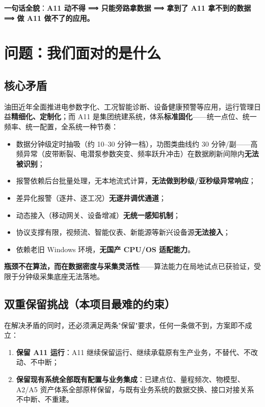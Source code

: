 \documentclass[11pt,a4paper]{ctexart}
\begin{document}
\textbf{一句话全貌}：\textbf{A11 动不得 ⟹ 只能旁路拿数据 ⟹ 拿到了 A11 拿不到的数据 ⟹ 做 A11 做不了的应用。}

\section{问题：我们面对的是什么}

\subsection{核心矛盾}

油田近年全面推进电参数字化、工况智能诊断、设备健康预警等应用，运行管理日益\textbf{精细化、定制化}；而 A11 是集团统建系统，体系\textbf{标准固化}——统一点位、统一频率、统一配置，全系统一种节奏：

\begin{itemize}[leftmargin=*]
  \item 数据分钟级定时抽吸（约 10--30 分钟一档），功图类曲线约 30 分钟/副——高频异常（皮带断裂、电潜泵参数突变、频率跃升冲击）在数据刷新间隙内\textbf{无法被识别}；
  \item 报警依赖后台批量处理，无本地流式计算，\textbf{无法做到秒级/亚秒级异常响应}；
  \item 差异化报警（逐井、逐工况）\textbf{无逐井调优通道}；
  \item 动态接入（移动网关、设备增减）\textbf{无统一感知机制}；
  \item 协议支撑有限，视频流、智能仪表、新能源等新兴设备源\textbf{无法接入}；
  \item 依赖老旧 Windows 环境，\textbf{无国产 CPU/OS 适配能力}。
\end{itemize}

\textbf{瓶颈不在算法，而在数据密度与采集灵活性}——算法能力在局地试点已获验证，受限于分钟级采集底座无法落地。

\subsection{双重保留挑战（本项目最难的约束）}

在解决矛盾的同时，还必须满足两条"保留"要求，任何一条做不到，方案即不成立：

\begin{enumerate}[leftmargin=*]
  \item \textbf{保留 A11 运行}：A11 继续保留运行、继续承载原有生产业务，不替代、不改动、不中断；
  \item \textbf{保留现有系统全部既有配置与业务集成}：已建点位、量程频次、物模型、A2/A5 资产体系全部原样保留，与既有业务系统的数据交换、接口对接关系不中断、不重建。
\end{enumerate}
\end{document}
